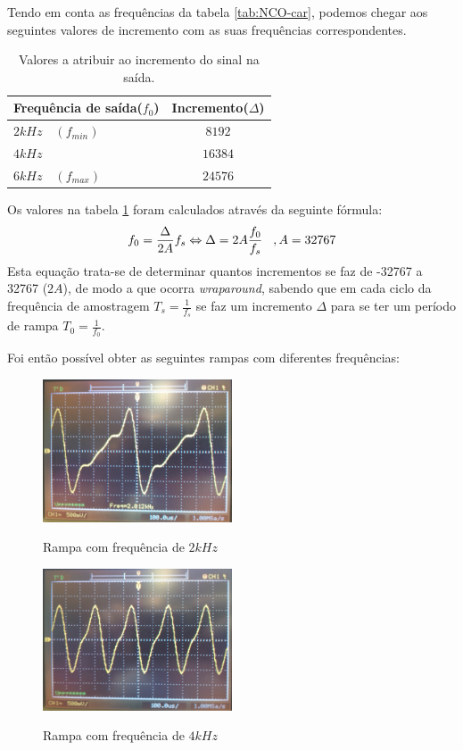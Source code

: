 \documentclass[11pt]{article}
\numberwithin{equation}{section}
\begin{document}
	Tendo em conta as frequências da tabela \ref{tab:NCO-car}, podemos chegar aos seguintes valores de incremento com as suas frequências correspondentes.                      
	\begin{table}[H]
		\centering
		\caption{Valores a atribuir ao incremento do sinal na saída.}
		\label{tab:incrementos}
		\begin{tabular}[c]{|l||c|}
			\hline \textbf{Frequência de saída($f_0$)} & \textbf{Incremento($\Delta$)}\\ 
			\hline $ 2 kHz \quad (f_{min}) $ & $ 8192 $\\ 
			\hline $ 4 kHz $ & $ 16384 $  \\ 
			\hline $ 6 kHz \quad (f_{max}) $ & $ 24576 $ \\ 
			\hline
		\end{tabular}
	\end{table}
	Os valores na tabela \ref{tab:incrementos} foram calculados através da seguinte fórmula:
	\begin{equation}
	f_{0}= \frac{\Delta}{2A}f_{s} \Leftrightarrow \Delta= 2A\frac{f_{0}}{f_{s}} \hspace{3 mm}, A=32767
	\end{equation}
	Esta equação trata-se de determinar quantos incrementos se faz de -32767 a 32767 ($2A$), de modo a que ocorra \textit{wraparound}, sabendo que em cada ciclo da frequência de amostragem $T_s=\frac{1}{f_s}$ se faz um incremento $\Delta$ para se ter um período de rampa $T_0=\frac{1}{f_0}$.
	
	Foi então possível obter as seguintes rampas com diferentes frequências:
	\begin{figure}[H]
		\centering
		\includegraphics[width=0.5\textwidth]{./P1_2kHz}~\\
		\caption{Rampa com frequência de $ 2 kHz $}
	\end{figure}
	
	\begin{figure}[H]
		\centering
		\includegraphics[width=0.5\textwidth]{./P1_4kHz}~\\
		\caption{Rampa com frequência de $ 4 kHz $}
	\end{figure}
	
\end{document}
